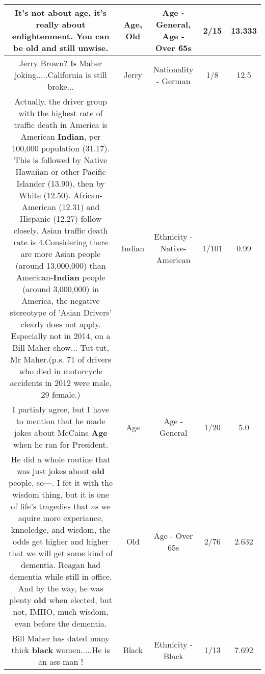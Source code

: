 \documentclass[11pt]{article}
\newlength\mylength
\begin{document}
\begin{center}
\begin{longtable}{|C{.65\mylength}|C{.30\mylength}|C{.12\mylength}|C{.12\mylength}|C{.12\mylength}|}
  \small It's not about \textbf{age}, it's really about enlightenment. You can be \textbf{old} and still unwise.\normalsize   & Age, Old & Age - General, Age - Over 65s & 2/15 & 13.333 \\  \hline
  \small Jerry Brown? Is Maher joking.....California is still broke...\normalsize   & Jerry & Nationality - German & 1/8 & 12.5 \\  \hline
  \small Actually, the driver group with the highest rate of traffic death in America is American \textbf{Indian}, per 100,000 population (31.17). This is followed by Native Hawaiian or other Pacific Islander (13.90), then by White (12.50). African-American (12.31) and Hispanic (12.27) follow closely. Asian traffic death rate is 4.Considering there are more Asian people (around 13,000,000) than American-\textbf{Indian} people (around 3,000,000) in America, the negative stereotype of 'Asian Drivers' clearly does not apply. Especially not in 2014, on a Bill Maher show... Tut tut, Mr Maher.(p.s. 71 of drivers who died in motorcycle accidents in 2012 were male, 29 female.)\normalsize   & Indian & Ethnicity - Native-American & 1/101 & 0.99 \\  \hline
  \small I partialy agree, but I have to mention that he made jokes about McCains \textbf{Age} when he ran for President.\normalsize   & Age & Age - General & 1/20 & 5.0 \\  \hline
  \small He did a whole routine that was just jokes about \textbf{old} people, so---. I fet it with the wisdom thing, but it is one of life's tragedies that as we aquire more experiance, knnoledge, and wisdom, the odds get higher and higher that we will get some kind of dementia. Reagan had dementia while still in office. And by the way, he was plenty \textbf{old} when elected, but not, IMHO, much wisdom, evan before the dementia.\normalsize   & Old & Age - Over 65s & 2/76 & 2.632 \\  \hline
  \small Bill Maher has dated many thick \textbf{black} women.....He is an ass man !\normalsize   & Black & Ethnicity - Black & 1/13 & 7.692 \\  \hline

\end{longtable}
\end{center}
\end{document}

